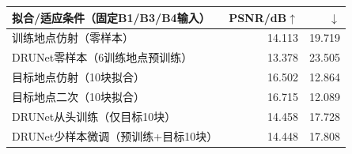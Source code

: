 \begin{tabular}{@{}lrr@{}}
\toprule
拟合/适应条件（固定B1/B3/B4输入） & PSNR/dB$\uparrow$ & \dE{}$\downarrow$\\
\midrule
训练地点仿射（零样本） & 14.113 & 19.719\\
DRUNet零样本（6训练地点预训练） & 13.378 & 23.505\\
\midrule
目标地点仿射（10块拟合） & 16.502 & 12.864\\
目标地点二次（10块拟合） & 16.715 & 12.089\\
DRUNet从头训练（仅目标10块） & 14.458 & 17.728\\
DRUNet少样本微调（预训练+目标10块） & 14.448 & 17.808\\
\bottomrule
\end{tabular}
